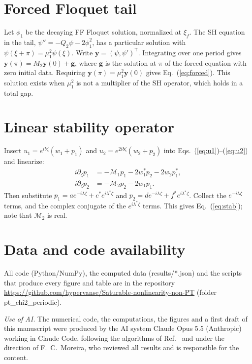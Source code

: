 \documentclass[pra,twocolumn,superscriptaddress,longbibliography]{revtex4-2}
\newif\ifaiauthor
\newif\ifshowtodos
\newcommand{\todo}[1]{\ifshowtodos\textcolor{red}{[TODO: #1]}\fi}
\begin{document}
\appendix
\section{Forced Floquet tail}\label{app:tail}
Let $\phi_1$ be the decaying FF Floquet solution, normalized at $\xi_f$. The SH equation in the
tail, $\psi'' = -Q_2\psi - 2\phi_1^2$, has a particular solution with $\psi(\xi+\pi) = \mu_1^2\psi(\xi)$.
Write $\bm y=(\psi,\psi')^{\mathsf T}$. Integrating over one period gives
$\bm y(\pi) = M_2\bm y(0) + \bm g$, where $\bm g$ is the solution at $\pi$ of the forced equation
with zero initial data. Requiring $\bm y(\pi) = \mu_1^2\bm y(0)$ gives Eq.~(\ref{eq:forced}). This
solution exists when $\mu_1^2$ is not a multiplier of the SH operator, which holds in a total gap.

\section{Linear stability operator}\label{app:stab}
Insert $u_1 = e^{ib\zeta}(w_1+p_1)$ and $u_2 = e^{2ib\zeta}(w_2+p_2)$ into
Eqs.~(\ref{eq:u1})--(\ref{eq:u2}) and linearize:
\begin{align*}
i\partial_\zeta p_1 &= -\mathcal M_1p_1 - 2w_1^{*}p_2 - 2w_2p_1^{*},\\
i\partial_\zeta p_2 &= -\mathcal M_2p_2 - 2w_1p_1.
\end{align*}
Then substitute $p_1 = ae^{-i\lambda\zeta}+c^{*}e^{i\lambda^{*}\zeta}$ and
$p_2 = de^{-i\lambda\zeta}+f^{*}e^{i\lambda^{*}\zeta}$. Collect the $e^{-i\lambda\zeta}$ terms, and
the complex conjugate of the $e^{i\lambda^{*}\zeta}$ terms. This gives Eq.~(\ref{eq:stab}); note
that $\mathcal M_2$ is real.

\section*{Data and code availability}
All code (Python/NumPy), the computed data (results/*.json) and the scripts that produce every
figure and table are in the repository
\url{https://github.com/hypervanse/Saturable-nonlinearity-non-PT} (folder pt\_chi2\_periodic).
\todo{archive with a DOI, e.g.\ Zenodo, before submission}

\begin{acknowledgments}
\todo{funding and acknowledgments.}
\ifaiauthor\else
\emph{Use of AI.} The numerical code, the computations, the figures and a first draft of this
manuscript were produced by the AI system Claude Opus 5.5 (Anthropic) working in Claude Code,
following the algorithms of Ref.~\cite{MoreiraThesis} and under the direction of F.~C.~Moreira,
who reviewed all results and is responsible for the content.
\fi
\end{acknowledgments}


\end{document}
